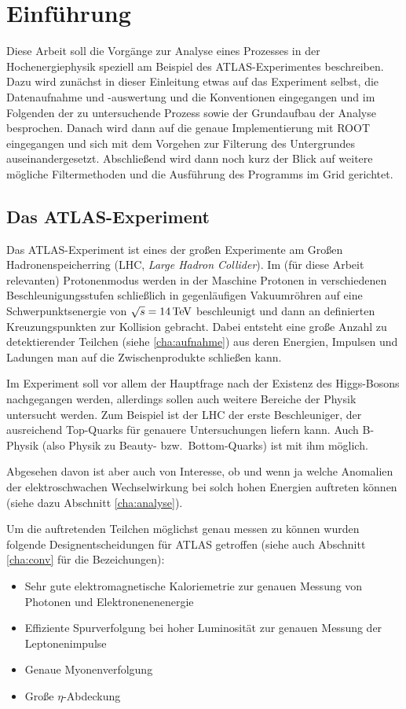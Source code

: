 \section{Einführung}
Diese Arbeit soll die Vorgänge zur Analyse eines Prozesses in der
Hochenergiephysik speziell am Beispiel des ATLAS-Experimentes beschreiben.  Dazu
wird zunächst in dieser Einleitung etwas auf das Experiment selbst, die
Datenaufnahme und -auswertung und die Konventionen eingegangen und im Folgenden
der zu untersuchende Prozess sowie der Grundaufbau der Analyse besprochen.
Danach wird dann auf die genaue Implementierung mit ROOT eingegangen und sich
mit dem Vorgehen zur Filterung des Untergrundes auseinandergesetzt. Abschließend
wird dann noch kurz der Blick auf weitere mögliche Filtermethoden und die
Ausführung des Programms im Grid gerichtet.

\subsection{Das ATLAS-Experiment}
Das ATLAS-Experiment ist eines der großen Experimente am Großen
Hadronenspeicherring (LHC, \emph{Large Hadron Collider}). Im (für diese Arbeit
relevanten) Protonenmodus werden in der Maschine Protonen in verschiedenen
Beschleunigungsstufen schließlich in gegenläufigen Vakuumröhren auf eine
Schwerpunktsenergie von $\sqrt{s} = \unit[14]{TeV}$ beschleunigt und dann an
definierten Kreuzungspunkten zur Kollision gebracht.  Dabei entsteht eine große
Anzahl zu detektierender Teilchen (siehe \ref{cha:aufnahme}) aus deren Energien,
Impulsen und Ladungen man auf die Zwischenprodukte schließen kann.

Im Experiment soll vor allem der Hauptfrage nach der Existenz des
Higgs-Bosons nachgegangen werden, allerdings sollen auch weitere Bereiche der
Physik untersucht werden. Zum Beispiel ist der LHC der erste Beschleuniger, der
ausreichend Top-Quarks für genauere Untersuchungen liefern kann. Auch B-Physik
(also Physik zu Beauty- bzw.\ Bottom-Quarks) ist mit ihm möglich.

Abgesehen davon ist aber auch von Interesse, ob und wenn ja welche Anomalien der
elektroschwachen Wechselwirkung bei solch hohen Energien auftreten können (siehe
dazu Abschnitt \ref{cha:analyse}).

Um die auftretenden Teilchen möglichst genau messen zu können wurden folgende
Designentscheidungen für ATLAS getroffen\cite{atlas-tp} (siehe auch Abschnitt
\ref{cha:conv} für die Bezeichungen):
\begin{itemize}
  \item Sehr gute elektromagnetische Kaloriemetrie zur genauen Messung von
    Photonen und Elektronenenenergie
  \item Effiziente Spurverfolgung bei hoher Luminosität zur genauen Messung der
    Leptonenimpulse
  \item Genaue Myonenverfolgung
  \item Große $\eta$-Abdeckung 
\end{itemize}

